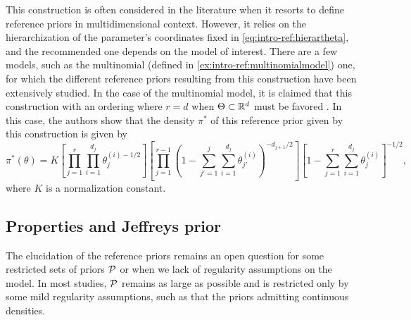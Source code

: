 This construction is often considered in the literature when it resorts to define reference priors in multidimensional context. 
However, it relies on the hierarchization of the parameter's coordinates fixed in \cref{eq:intro-ref:hierartheta}, and the recommended  one depends on the model of interest.
There are a few models, such as the multinomial (defined in \cref{ex:intro-ref:multinomialmodel}) one, for which the different reference priors resulting from this construction have been extensively studied. In the case of the multinomial model, it is claimed that this construction with an ordering where $r=d$ when $\Theta\subset\mathbb{R}^d$ must be favored  \citep{berger_ordered_1992,berger_overall_2015}.
{In this case, the authors show that the density $\pi^\ast$ of this reference prior given by this construction is given by
    \begin{equation}\label{eq:intro-ref:multinomialhierarref}
        \pi^\ast(\theta) = K \left[\prod_{j=1}^r\prod_{i=1}^{d_j}\theta_j^{(i)-1/2} \right] \left[\prod_{j=1}^{r-1} \left(1- \sum_{j'=1}^j\sum_{i=1}^{d_j}\theta_{j'}^{(i)}   \right)^{-d_{j+1}/2}  \right] \left[1- \sum_{j=1}^r\sum_{i=1}^{d_j}\theta_j^{(i)} \right]^{-1/2},
    \end{equation}
where $K$ is a normalization constant.}





\subsection{Properties and Jeffreys prior}\label{sec:intro-ref:properties}







The elucidation of the reference priors remains an open question for some restricted sets of priors $\mathcal{P}$ or when we lack of regularity assumptions on the model.
In most studies, $\mathcal{P}$ remains as large as possible and is restricted only by some mild regularity assumptions, such as that the priors admitting continuous densities.
    
